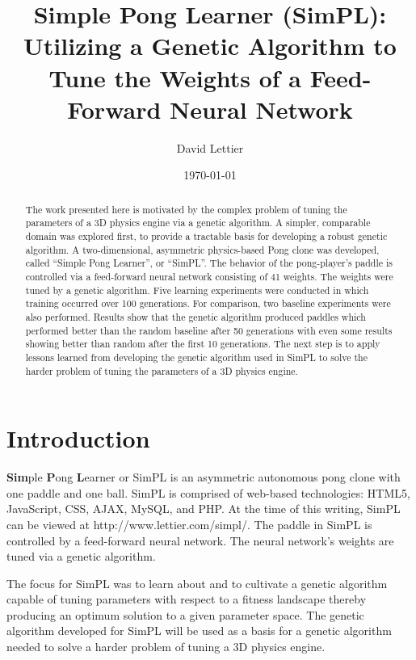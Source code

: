 \documentclass[a4paper,10pt]{article}
\title{Simple Pong Learner (SimPL): Utilizing a Genetic Algorithm to Tune the Weights of a Feed-Forward Neural Network}
\date{\today}
\author{David Lettier}
\begin{document}
\maketitle

\begin{abstract}

The work presented here is motivated by the complex problem of tuning the parameters of a 3D physics engine via a genetic algorithm. A simpler, comparable domain was explored first, to provide a tractable basis for developing a robust genetic algorithm. A two-dimensional, asymmetric physics-based Pong clone was developed, called ``Simple Pong Learner'', or ``SimPL''.  The behavior of the pong-player's paddle is controlled via a feed-forward neural network consisting of 41 weights. The weights were tuned by a genetic algorithm. Five learning experiments were conducted in which training occurred over 100 generations. For comparison, two baseline experiments were also performed. Results show that the genetic algorithm produced paddles which performed better than the random baseline after 50 generations with even some results showing better than random after the first 10 generations. The next step is to apply lessons learned from developing the genetic algorithm used in SimPL to solve the harder problem of tuning the parameters of a 3D physics engine.

\end{abstract}

\section{Introduction}

\textbf{Sim}ple \textbf{P}ong \textbf{L}earner or SimPL is an asymmetric autonomous pong clone with one paddle and one ball. SimPL is comprised of web-based technologies: HTML5, JavaScript, CSS, AJAX, MySQL, and PHP. At the time of this writing, SimPL can be viewed at http://www.lettier.com/simpl/. The paddle in SimPL is controlled by a feed-forward neural network. The neural network's weights are tuned via a genetic algorithm. 

The focus for SimPL was to learn about and to cultivate a genetic algorithm capable of tuning parameters with respect to a fitness landscape thereby producing an optimum solution to a given parameter space. The genetic algorithm developed for SimPL will be used as a basis for a genetic algorithm needed to solve a harder problem of tuning a 3D physics engine. 
\end{document}
